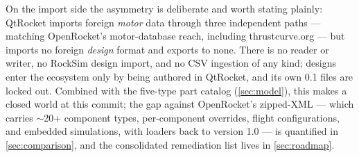 On the import side the asymmetry is deliberate and worth stating plainly: QtRocket imports foreign
\emph{motor} data through three independent paths --- matching OpenRocket's motor-database reach,
including thrustcurve.org --- but imports no foreign \emph{design} format and exports to none.
There is no  reader or writer, no RockSim  design import, and no CSV
ingestion of any kind; designs enter the ecosystem only by being authored in QtRocket, and its own
0.1 files are locked out. Combined with the five-type part catalog (\cref{sec:model}), this makes
 a closed world at this commit; the gap against OpenRocket's zipped-XML  ---
which carries $\sim$20+ component types, per-component overrides, flight configurations, and
embedded simulations, with loaders back to version 1.0 --- is quantified in \cref{sec:comparison},
and the consolidated remediation list lives in \cref{sec:roadmap}.
